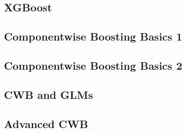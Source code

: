 \subsection{XGBoost}


\subsection{Componentwise Boosting Basics 1}


\subsection{Componentwise Boosting Basics 2}


\subsection{CWB and GLMs}


\subsection{Advanced CWB}









